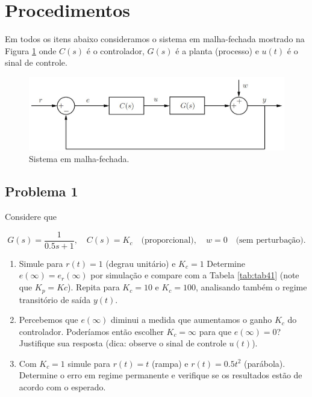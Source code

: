 \documentclass[
]{book}
\providecommand{\tightlist}{%
  \setlength{\itemsep}{0pt}\setlength{\parskip}{0pt}}
\begin{document}
\hypertarget{procedimentos-2}{%
\section{Procedimentos}\label{procedimentos-2}}

Em todos os itens abaixo consideramos o sistema em malha-fechada mostrado na Figura \ref{fig:fig43} onde \(C(s)\) é o controlador, \(G(s)\) é a planta (processo) e \(u(t)\) é o sinal de controle.

\begin{figure}
\includegraphics[width=0.8\linewidth]{Imagens/Lab4/Apresentação/fig3} \caption{Sistema em malha-fechada.}\label{fig:fig43}
\end{figure}

\hypertarget{problema-1-2}{%
\subsection*{Problema 1}\label{problema-1-2}}

Considere que

\[
G(s) = \frac {1}{0.5s+1}, \quad C(s) = K_c \quad \text{(proporcional)}, \quad w=0 \quad \text{(sem perturbação)}.
\]

\begin{enumerate}
\def\labelenumi{\alph{enumi}.}
\tightlist
\item
  Simule para \(r(t) = 1\) (degrau unitário) e \(K_c = 1\) Determine \(e(\infty) = e_r(\infty)\) por simulação e compare com a Tabela \ref{tab:tab41} (note que \(K_p = Kc\)). Repita para \(K_c = 10\) e \(K_c = 100\), analisando também o regime transitório de saída \(y(t)\).
\item
  Percebemos que \(e(\infty)\) diminui a medida que aumentamos o ganho \(K_c\) do controlador. Poderíamos então escolher \(K_c = \infty\) para que \(e(\infty) = 0\)? Justifique sua resposta (dica: observe o sinal de controle \(u(t)\)).
\item
  Com \(K_c = 1\) simule para \(r(t) = t\) (rampa) e \(r(t) = 0.5t^2\) (parábola). Determine o erro em regime permanente e verifique se os resultados estão de acordo com o esperado.
\end{enumerate}
\end{document}
